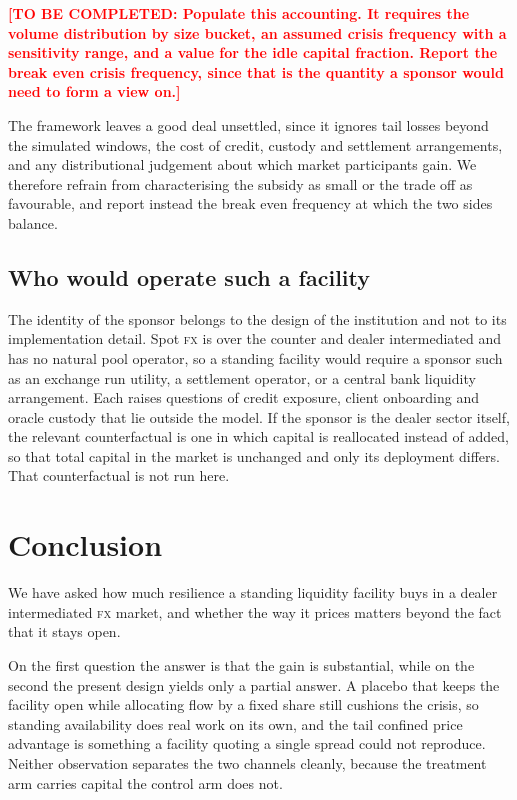 \documentclass[a4paper,fleqn]{cas-sc}
\newcommand{\acro}[1]{\textsc{\MakeLowercase{#1}}\xspace}
\newcommand{\FX}{\acro{FX}}
\newcommand{\TODO}[1]{\textcolor{red}{\textbf{[TO BE COMPLETED: #1]}}}
\begin{document}
\TODO{Populate this accounting. It requires the volume distribution by size bucket, an assumed crisis frequency with a sensitivity range, and a value for the idle capital fraction. Report the break even crisis frequency, since that is the quantity a sponsor would need to form a view on.}

The framework leaves a good deal unsettled, since it ignores tail losses beyond the simulated windows, the cost of credit, custody and settlement arrangements, and any distributional judgement about which market participants gain. We therefore refrain from characterising the subsidy as small or the trade off as favourable, and report instead the break even frequency at which the two sides balance.

\subsection{Who would operate such a facility}

The identity of the sponsor belongs to the design of the institution and not to its implementation detail. Spot \FX{} is over the counter and dealer intermediated and has no natural pool operator, so a standing facility would require a sponsor such as an exchange run utility, a settlement operator, or a central bank liquidity arrangement. Each raises questions of credit exposure, client onboarding and oracle custody that lie outside the model. If the sponsor is the dealer sector itself, the relevant counterfactual is one in which capital is reallocated instead of added, so that total capital in the market is unchanged and only its deployment differs. That counterfactual is not run here.

\section{Conclusion}
\label{sec:conc}

We have asked how much resilience a standing liquidity facility buys in a dealer intermediated \FX{} market, and whether the way it prices matters beyond the fact that it stays open.

On the first question the answer is that the gain is substantial, while on the second the present design yields only a partial answer. A placebo that keeps the facility open while allocating flow by a fixed share still cushions the crisis, so standing availability does real work on its own, and the tail confined price advantage is something a facility quoting a single spread could not reproduce. Neither observation separates the two channels cleanly, because the treatment arm carries capital the control arm does not.
\end{document}
